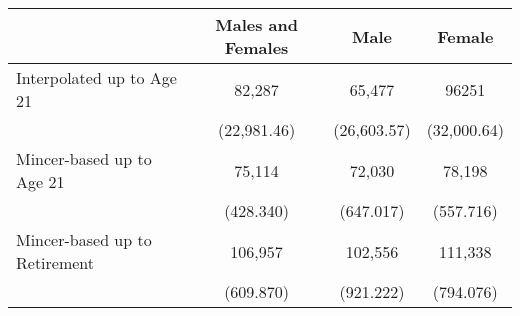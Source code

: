 \begin{tabular}{lccc} \toprule
 & Males and Females  & Male  & Female  \\  \midrule
 Interpolated up to Age 21 & 82,287 & 65,477 & 96251 \\
 & (22,981.46) & (26,603.57) & (32,000.64) \\
Mincer-based up to Age 21 &  75,114 &  72,030 &  78,198 \\  
 & (428.340) & (647.017) & (557.716) \\  
Mincer-based up to Retirement &  106,957 &  102,556 &  111,338 \\  
 & (609.870) & (921.222) & (794.076) \\  
\hline \hline \end{tabular} 
